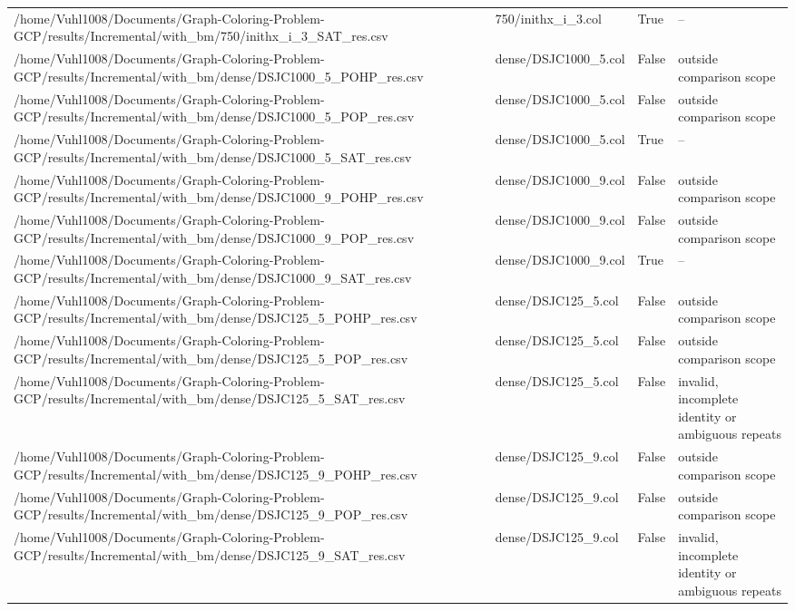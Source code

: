 \begin{table}[htbp]
\begin{tabular}{llll}
/home/Vuhl1008/Documents/Graph-Coloring-Problem-GCP/results/Incremental/with\_bm/750/inithx\_i\_3\_SAT\_res.csv & 750/inithx\_i\_3.col & True & -- \\
/home/Vuhl1008/Documents/Graph-Coloring-Problem-GCP/results/Incremental/with\_bm/dense/DSJC1000\_5\_POHP\_res.csv & dense/DSJC1000\_5.col & False & outside comparison scope \\
/home/Vuhl1008/Documents/Graph-Coloring-Problem-GCP/results/Incremental/with\_bm/dense/DSJC1000\_5\_POP\_res.csv & dense/DSJC1000\_5.col & False & outside comparison scope \\
/home/Vuhl1008/Documents/Graph-Coloring-Problem-GCP/results/Incremental/with\_bm/dense/DSJC1000\_5\_SAT\_res.csv & dense/DSJC1000\_5.col & True & -- \\
/home/Vuhl1008/Documents/Graph-Coloring-Problem-GCP/results/Incremental/with\_bm/dense/DSJC1000\_9\_POHP\_res.csv & dense/DSJC1000\_9.col & False & outside comparison scope \\
/home/Vuhl1008/Documents/Graph-Coloring-Problem-GCP/results/Incremental/with\_bm/dense/DSJC1000\_9\_POP\_res.csv & dense/DSJC1000\_9.col & False & outside comparison scope \\
/home/Vuhl1008/Documents/Graph-Coloring-Problem-GCP/results/Incremental/with\_bm/dense/DSJC1000\_9\_SAT\_res.csv & dense/DSJC1000\_9.col & True & -- \\
/home/Vuhl1008/Documents/Graph-Coloring-Problem-GCP/results/Incremental/with\_bm/dense/DSJC125\_5\_POHP\_res.csv & dense/DSJC125\_5.col & False & outside comparison scope \\
/home/Vuhl1008/Documents/Graph-Coloring-Problem-GCP/results/Incremental/with\_bm/dense/DSJC125\_5\_POP\_res.csv & dense/DSJC125\_5.col & False & outside comparison scope \\
/home/Vuhl1008/Documents/Graph-Coloring-Problem-GCP/results/Incremental/with\_bm/dense/DSJC125\_5\_SAT\_res.csv & dense/DSJC125\_5.col & False & invalid, incomplete identity or ambiguous repeats \\
/home/Vuhl1008/Documents/Graph-Coloring-Problem-GCP/results/Incremental/with\_bm/dense/DSJC125\_9\_POHP\_res.csv & dense/DSJC125\_9.col & False & outside comparison scope \\
/home/Vuhl1008/Documents/Graph-Coloring-Problem-GCP/results/Incremental/with\_bm/dense/DSJC125\_9\_POP\_res.csv & dense/DSJC125\_9.col & False & outside comparison scope \\
/home/Vuhl1008/Documents/Graph-Coloring-Problem-GCP/results/Incremental/with\_bm/dense/DSJC125\_9\_SAT\_res.csv & dense/DSJC125\_9.col & False & invalid, incomplete identity or ambiguous repeats \\

\end{tabular}
\end{table}
